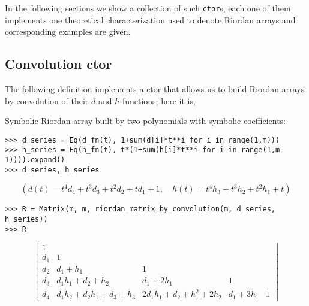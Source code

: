 In the following sections we show a collection of such \verb|ctor|s, each one
of them implements one theoretical characterization used to denote Riordan
arrays and corresponding examples are given.

\subsection{Convolution ctor}

The following definition implements a ctor that allows us to build Riordan
arrays by convolution of their $d$ and $h$ functions; here it is,


\begin{example}
Symbolic Riordan array built by two polynomials with symbolic coefficients:
\begin{verbatim}
>>> d_series = Eq(d_fn(t), 1+sum(d[i]*t**i for i in range(1,m)))
>>> h_series = Eq(h_fn(t), t*(1+sum(h[i]*t**i for i in range(1,m-1)))).expand()
>>> d_series, h_series
\end{verbatim}
\begin{displaymath}
\left ( d{\left (t \right )} = t^{4} d_{4} + t^{3} d_{3} + t^{2} d_{2} + t d_{1} + 1, \quad h{\left (t \right )} = t^{4} h_{3} + t^{3} h_{2} + t^{2} h_{1} + t\right )
\end{displaymath}
\begin{verbatim}
>>> R = Matrix(m, m, riordan_matrix_by_convolution(m, d_series, h_series))
>>> R
\end{verbatim}
\begin{displaymath}
\left[\begin{matrix}1 &   &   &   &  \\d_{1} & 1 &   &   &  \\d_{2} & d_{1} + h_{1} & 1 &   &  \\d_{3} & d_{1} h_{1} + d_{2} + h_{2} & d_{1} + 2 h_{1} & 1 &  \\d_{4} & d_{1} h_{2} + d_{2} h_{1} + d_{3} + h_{3} & 2 d_{1} h_{1} + d_{2} + h_{1}^{2} + 2 h_{2} & d_{1} + 3 h_{1} & 1\end{matrix}\right]
\end{displaymath}
\end{example}

